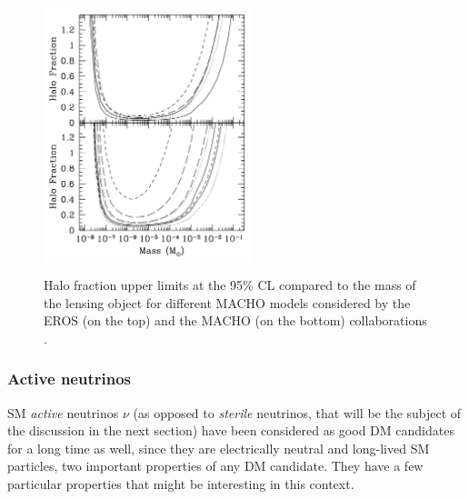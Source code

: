 \documentclass[a4paper, 10pt, openright]{report}
\begin{document}
\begin{figure}[htbp]
\begin{center}
\includegraphics[width=6cm, height=8cm]{figs/MACHOExclusion.png}
\caption{Halo fraction upper limits at the 95\% \ac{CL} compared to the mass of the lensing object for different \ac{MACHO} models considered by the EROS (on the top) and the MACHO (on the bottom) collaborations \cite{ExclusionMACHO}.}
\label{figure:ExclusionMACHO}
\end{center}
\end{figure}

\subsubsection*{Active neutrinos}
\ac{SM} \textit{active} neutrinos $\nu$ (as opposed to \textit{sterile} neutrinos, that will be the subject of the discussion in the next section) have been considered as good \ac{DM} candidates for a long time as well, since they are electrically neutral and long-lived \ac{SM} particles, two important properties of any \ac{DM} candidate. They have a few particular properties that might be interesting in this context.
\end{document}
